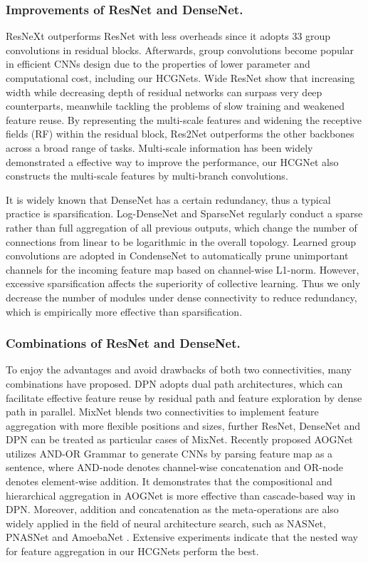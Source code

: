 \documentclass[letterpaper]{article}
\begin{document}
 	\subsubsection{Improvements of ResNet and DenseNet.}ResNeXt \cite{xie2017aggregated} outperforms ResNet with less overheads since it adopts 33 group convolutions in residual blocks. Afterwards, group convolutions become popular in efficient CNNs design due to the properties of lower parameter and computational cost, including our HCGNets. Wide ResNet \cite{Wide} show that increasing width while decreasing depth of residual networks can surpass very deep counterparts, meanwhile tackling the problems of slow training and weakened feature reuse. By representing the multi-scale features and widening the receptive fields (RF) within the residual block, Res2Net \cite{gao2019res2net} outperforms the other backbones across a broad range of tasks. Multi-scale information has been widely demonstrated a effective way to improve the performance, our HCGNet also constructs the multi-scale features by multi-branch convolutions.  
 	
 	It is widely known that DenseNet has a certain redundancy, thus a typical practice is sparsification. Log-DenseNet \cite{hu2017log} and SparseNet \cite{zhu2018sparsely} regularly conduct a sparse rather than full aggregation of all previous outputs, which change the number of connections from linear to be logarithmic in the overall topology. Learned group convolutions are adopted in CondenseNet \cite{huang2018condensenet} to automatically prune unimportant channels for the incoming feature map based on channel-wise L1-norm. However, excessive sparsification affects the superiority of collective learning. Thus we only decrease the number of modules under dense connectivity to reduce redundancy, which is empirically more effective than sparsification.
 	
 	\subsubsection{Combinations of ResNet and DenseNet.} To enjoy the advantages and avoid drawbacks of both two connectivities, many combinations have proposed. DPN adopts dual path architectures, which can facilitate effective feature reuse by residual path and  feature exploration by dense path in parallel. MixNet blends two connectivities to implement feature aggregation with more flexible positions and sizes, further ResNet, DenseNet and DPN can be treated as particular cases of MixNet. Recently proposed AOGNet utilizes AND-OR Grammar to generate CNNs by parsing feature map as a sentence, where AND-node denotes channel-wise concatenation and OR-node denotes element-wise addition. It demonstrates that the compositional and hierarchical aggregation in AOGNet is more effective than cascade-based way in DPN. Moreover, addition and concatenation as the meta-operations are also widely applied in the field of neural architecture search, such as NASNet, PNASNet \cite{liu2018progressive} and AmoebaNet \cite{real2019regularized}. Extensive experiments indicate that the nested way for feature aggregation in our HCGNets perform the best. 
 	
\end{document}
